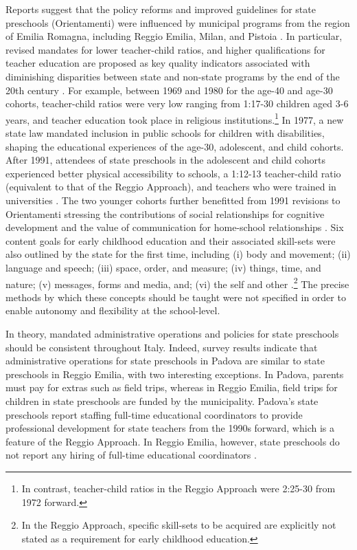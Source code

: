 Reports suggest that the policy reforms and improved guidelines for state preschools (Orientamenti) were influenced by municipal programs from the region of Emilia Romagna, including Reggio Emilia, Milan, and Pistoia \citep{OECD_2001_Italy-Country-Note}. In particular, revised mandates for lower teacher-child ratios, and higher qualifications for teacher education are proposed as key quality indicators associated with diminishing disparities between state and non-state programs by the end of the 20th century \citep{Hohnerlein_2015_Development-and-Diffusion}. For example, between 1969 and 1980 for the age-40 and age-30 cohorts, teacher-child ratios were very low ranging from 1:17-30 children aged 3-6 years, and teacher education took place in religious institutions.\footnote{In contrast, teacher-child ratios in the Reggio Approach were 2:25-30 from 1972 forward.} In 1977, a new state law mandated inclusion in public schools for children with disabilities, shaping the educational experiences of the age-30, adolescent, and child cohorts. After 1991, attendees of state preschools in the adolescent and child cohorts experienced better physical accessibility to schools, a 1:12-13 teacher-child ratio (equivalent to that of the Reggio Approach), and teachers who were trained in universities \citep{Hohnerlein_2015_Development-and-Diffusion}. The two younger cohorts further benefitted from 1991 revisions to Orientamenti stressing the contributions of social relationships for cognitive development and the value of communication for home-school relationships \citep{OECD_2001_Italy-Country-Note}. Six content goals for early childhood education and their associated skill-sets were also outlined by the state for the first time, including (i) body and movement; (ii) language and speech; (iii) space, order, and measure; (iv) things, time, and nature; (v) messages, forms and media, and; (vi) the self and other \citep{Orientamenti_1991_Scuola-Materna}.\footnote{In the Reggio Approach, specific skill-sets to be acquired are explicitly not stated as a requirement for early childhood education.} The precise methods by which these concepts should be taught were not specified in order to enable autonomy and flexibility at the school-level.

In theory, mandated administrative operations and policies for state preschools should be consistent throughout Italy. Indeed, survey results indicate that administrative operations for state preschools in Padova are similar to state preschools in Reggio Emilia, with two interesting exceptions. In Padova, parents must pay for extras such as field trips, whereas in Reggio Emilia, field trips for children in state preschools are funded by the municipality. Padova's state preschools report staffing full-time educational coordinators to provide professional development for state teachers from the 1990s forward, which is a feature of the Reggio Approach. In Reggio Emilia, however, state preschools do not report any hiring of full-time educational coordinators \citep{CEHD_2016_Historical-Analysis}.

